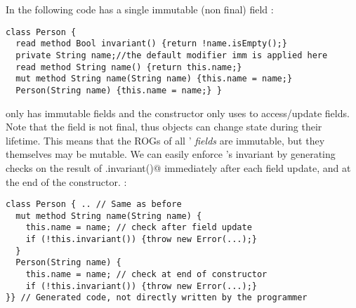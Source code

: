 In the following code \Q@Person@ has a single immutable (non final) field \Q@name@:
\begin{lstlisting}
class Person {
  read method Bool invariant() {return !name.isEmpty();}
  private String name;//the default modifier imm is applied here
  read method String name() {return this.name;}
  mut method String name(String name) {this.name = name;}
  Person(String name) {this.name = name;} }
\end{lstlisting}
\Q@Person@ only has immutable fields and the constructor only uses \Q@this@ to access/update fields.
Note that the \Q@name@ field is not final, thus \Q@Person@ objects can change state during their lifetime. This means that the ROGs of all \Q@Person@s' \emph{fields} are immutable, but they themselves may be mutable.
We can easily enforce \Q@Person@'s invariant by generating checks on the result of \Q@this.invariant()@ immediately after each field update, and at the end of the constructor.%
:

\begin{lstlisting}
class Person { .. // Same as before
  mut method String name(String name) {
    this.name = name; // check after field update
    if (!this.invariant()) {throw new Error(...);} 
  }
  Person(String name) {
    this.name = name; // check at end of constructor
    if (!this.invariant()) {throw new Error(...);}
}} // Generated code, not directly written by the programmer
\end{lstlisting}

